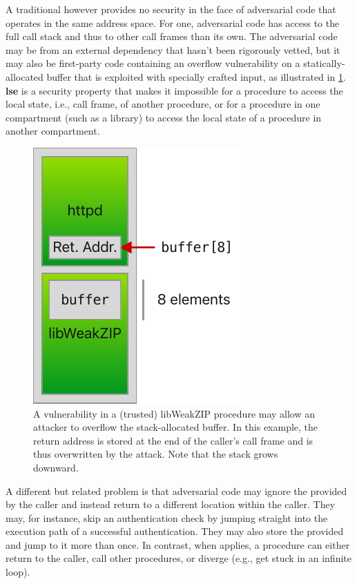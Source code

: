 \documentclass[main.tex]{subfiles}
\begin{document}
A traditional  however provides no security in the face of adversarial code that operates in the same address space. For one, adversarial code has access to the full call stack and thus to other call frames than its own. The adversarial code may be from an external dependency that hasn't been rigorously vetted, but it may also be first-party code containing an overflow vulnerability on a statically-allocated buffer that is exploited with specially crafted input, as illustrated in \cref{fig:buffoverflow}. \textbf{\Gls{lse}} is a security property that makes it impossible for a procedure to access the local state, i.e., call frame, of another procedure, or for a procedure in one compartment (such as a library) to access the local state of a procedure in another compartment.

\begin{figure}
	\begin{center}
		\includegraphics{Images/Buffer Overflow.pdf}
	\end{center}
	\caption{A vulnerability in a (trusted) libWeakZIP procedure may allow an attacker to overflow the stack-allocated buffer. In this example, the return address is stored at the end of the caller's call frame and is thus overwritten by the attack. Note that the stack grows downward.}
	\label{fig:buffoverflow}
\end{figure}

A different but related problem is that adversarial code may ignore the  provided by the caller and instead return to a different location within the caller. They may, for instance, skip an authentication check by jumping straight into the execution path of a successful authentication. They may also store the provided  and jump to it more than once. In contrast, when \textbf{} applies, a procedure can either return to the caller, call other procedures, or diverge (e.g., get stuck in an infinite loop).
\end{document}
